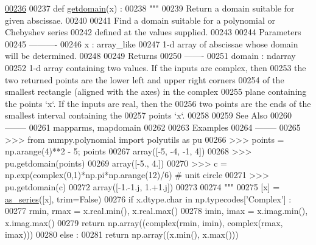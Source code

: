 \begin{DoxyCode}
\hypertarget{namespacepyneb_1_1utils_1_1polyutils_l00236}{}\hyperlink{namespacepyneb_1_1utils_1_1polyutils_afbf8321a135ca2dc247215e16ea3399f}{00236} 
00237 \textcolor{keyword}{def }\hyperlink{namespacepyneb_1_1utils_1_1polyutils_afbf8321a135ca2dc247215e16ea3399f}{getdomain}(x) :
00238     \textcolor{stringliteral}{"""}
00239 \textcolor{stringliteral}{    Return a domain suitable for given abscissae.}
00240 \textcolor{stringliteral}{}
00241 \textcolor{stringliteral}{    Find a domain suitable for a polynomial or Chebyshev series}
00242 \textcolor{stringliteral}{    defined at the values supplied.}
00243 \textcolor{stringliteral}{}
00244 \textcolor{stringliteral}{    Parameters}
00245 \textcolor{stringliteral}{    ----------}
00246 \textcolor{stringliteral}{    x : array\_like}
00247 \textcolor{stringliteral}{        1-d array of abscissae whose domain will be determined.}
00248 \textcolor{stringliteral}{}
00249 \textcolor{stringliteral}{    Returns}
00250 \textcolor{stringliteral}{    -------}
00251 \textcolor{stringliteral}{    domain : ndarray}
00252 \textcolor{stringliteral}{        1-d array containing two values.  If the inputs are complex, then}
00253 \textcolor{stringliteral}{        the two returned points are the lower left and upper right corners}
00254 \textcolor{stringliteral}{        of the smallest rectangle (aligned with the axes) in the complex}
00255 \textcolor{stringliteral}{        plane containing the points `x`. If the inputs are real, then the}
00256 \textcolor{stringliteral}{        two points are the ends of the smallest interval containing the}
00257 \textcolor{stringliteral}{        points `x`.}
00258 \textcolor{stringliteral}{}
00259 \textcolor{stringliteral}{    See Also}
00260 \textcolor{stringliteral}{    --------}
00261 \textcolor{stringliteral}{    mapparms, mapdomain}
00262 \textcolor{stringliteral}{}
00263 \textcolor{stringliteral}{    Examples}
00264 \textcolor{stringliteral}{    --------}
00265 \textcolor{stringliteral}{    >>> from numpy.polynomial import polyutils as pu}
00266 \textcolor{stringliteral}{    >>> points = np.arange(4)**2 - 5; points}
00267 \textcolor{stringliteral}{    array([-5, -4, -1,  4])}
00268 \textcolor{stringliteral}{    >>> pu.getdomain(points)}
00269 \textcolor{stringliteral}{    array([-5.,  4.])}
00270 \textcolor{stringliteral}{    >>> c = np.exp(complex(0,1)*np.pi*np.arange(12)/6) # unit circle}
00271 \textcolor{stringliteral}{    >>> pu.getdomain(c)}
00272 \textcolor{stringliteral}{    array([-1.-1.j,  1.+1.j])}
00273 \textcolor{stringliteral}{}
00274 \textcolor{stringliteral}{    """}
00275     [x] = \hyperlink{namespacepyneb_1_1utils_1_1polyutils_a9c3751d438f0f75922155c7823fe2699}{as\_series}([x], trim=\textcolor{keyword}{False})
00276     \textcolor{keywordflow}{if} x.dtype.char \textcolor{keywordflow}{in} np.typecodes[\textcolor{stringliteral}{'Complex'}] :
00277         rmin, rmax = x.real.min(), x.real.max()
00278         imin, imax = x.imag.min(), x.imag.max()
00279         \textcolor{keywordflow}{return} np.array((complex(rmin, imin), complex(rmax, imax)))
00280     \textcolor{keywordflow}{else} :
00281         \textcolor{keywordflow}{return} np.array((x.min(), x.max()))

\end{DoxyCode}
